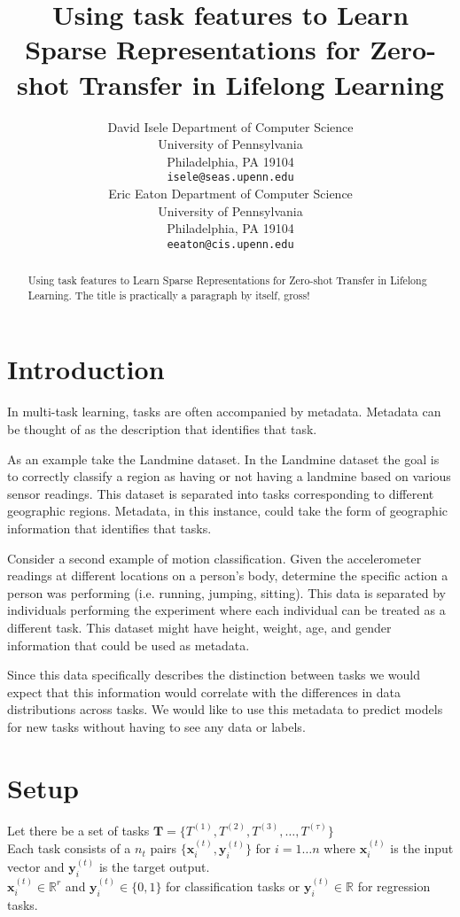 \documentclass{article} %
\title{Using task features to Learn Sparse Representations for Zero-shot Transfer in Lifelong Learning}
\author{
David Isele
Department of Computer Science\\
University of Pennsylvania\\
Philadelphia, PA 19104 \\
\texttt{isele@seas.upenn.edu} \\
\And
Eric Eaton
Department of Computer Science\\
University of Pennsylvania\\
Philadelphia, PA 19104 \\
\texttt{eeaton@cis.upenn.edu} \\
}
\newcommand{\Tt}[1]{T^{(#1)}}
\newcommand{\xit}[2]{\textbf{x}_{#1}^{(#2)}}
\newcommand{\yit}[2]{\textbf{y}_{#1}^{(#2)}}
\begin{document}
\maketitle

\begin{abstract}
Using task features to Learn Sparse Representations for Zero-shot Transfer in Lifelong Learning. The title is practically a paragraph by itself, gross!
\end{abstract}



\section{Introduction}
In multi-task learning, tasks are often accompanied by metadata. Metadata can be thought of as the description that identifies that task.

As an example take the Landmine dataset. In the Landmine dataset the goal is to correctly classify a region as having or not having a landmine based on various sensor readings. This dataset is separated into tasks corresponding to different geographic regions. Metadata, in this instance,  could take the form of geographic information that identifies that tasks. 

Consider a second example of motion classification. Given the accelerometer readings at different locations on a person's body, determine the specific action a person was performing (i.e. running, jumping, sitting). This data is separated by individuals performing the experiment where each individual can be treated as a different task. This dataset might have height, weight, age, and gender information that could be used as metadata.

Since this data specifically describes the distinction between tasks we would expect that this information would correlate with the differences in data distributions across tasks. We would like to use this metadata to predict models for new tasks without having to see any data or labels. 



\section{Setup}
Let there be a set of tasks $\bm{T} =\{ \Tt{1} ,\Tt{2} ,\Tt{3}, \dots, \Tt{\tau}    \}$ \\
Each task consists of a $n_t$ pairs $\{\xit{i}{t},\yit{i}{t}\}$ for $i={1 \dots n}$ where $\xit{i}{t}$ is the input vector and $\yit{i}{t}$ is the target output.\\
 $\xit{i}{t} \in \mathbb{R}^r$  and $\yit{i}{t} \in \{0,1\}$ for classification tasks or $\yit{i}{t} \in \mathbb{R}$ for regression tasks. 
\end{document}

